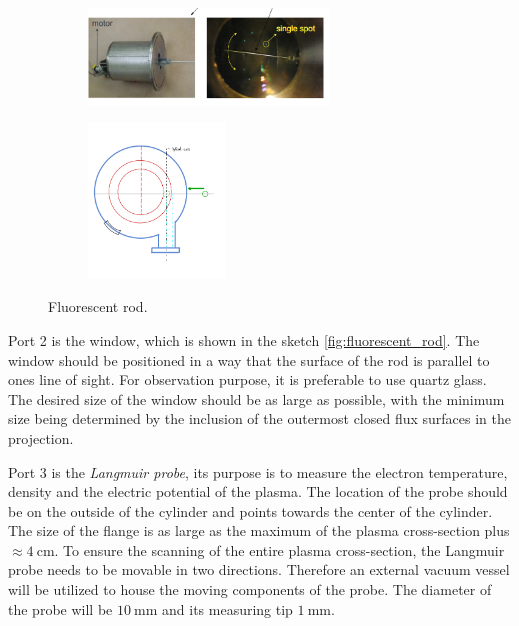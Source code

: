 \begin{figure}[H]
    \centering
    \begin{subfigure}[b]{1\textwidth}
        \centering
        \includegraphics[width=0.7\textwidth]{sections/imges/ports/fluorescent_rod.png}
        \label{fig:fluorescent_rod}
    \end{subfigure}
    \hfill
    \begin{subfigure}[b]{1\textwidth}
        \centering
        \includegraphics[width=0.4\textwidth]{sections/imges/ports/Flurescent_rod_new_sketch.jpeg}
        \label{fig:fluorescent_rod_sketch}
    \end{subfigure}
    \caption{Fluorescent rod.}
\end{figure}


Port 2 is the window, which is shown in the sketch \autoref{fig:fluorescent_rod}.
The window should be positioned in a way that the surface of the rod is parallel to ones line of sight.
For observation purpose, it is preferable to use quartz glass.
The desired size of the window should be as large as possible, with the minimum size being determined by the inclusion of the outermost closed flux surfaces in the projection.

Port 3 is the \emph{Langmuir probe}, its purpose is to measure the electron temperature, density and the electric potential of the plasma.
The location of the probe should be on the outside of the cylinder and points towards the center of the cylinder.
The size of the flange is as large as the maximum of the plasma cross-section plus $\approx 4~\si{\centi\meter}$.
To ensure the scanning of the entire plasma cross-section, the Langmuir probe needs to be movable in two directions.
Therefore an external vacuum vessel will be utilized to house the moving components of the probe.
The diameter of the probe will be $\SI{10}{\milli\meter}$ and its measuring tip $\SI{1}{\milli\meter}$.

